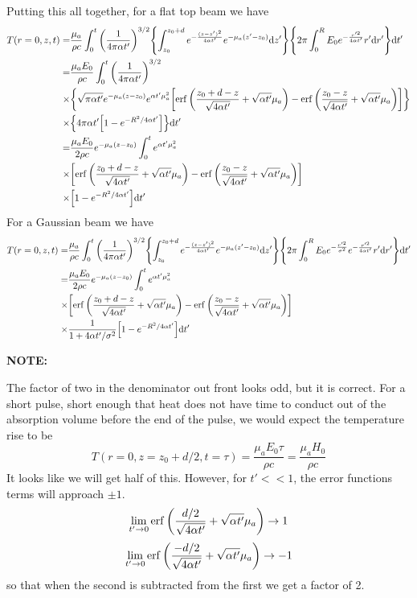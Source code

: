 \documentclass[]{article}
\begin{document}
Putting this all together, for a flat top beam we have
\begin{align}
  \label{eq:flattop_temp}
  T(r=0, z,t) =& \frac{\mu_a}{\rho c} \int_0^t \qty(\frac{1}{4\pi \alpha t'})^{3/2} \qty{\int_{z_0}^{z_0 + d}e^{-\frac{(z-z')^2}{4\alpha t'}} e^{-\mu_a (z'-z_0)} \dd z'} \qty{2\pi\int_{0}^{R} E_0 e^{-\frac{r'^2}{4\alpha t'}}r'\dd r'}\dd t' \nonumber \\
  =& \frac{\mu_a E_0}{\rho c} \int_0^t \qty(\frac{1}{4\pi \alpha t'})^{3/2}  \nonumber \\
  \times & \qty{\sqrt{\pi\alpha t'} e^{-\mu_a (z-z_0)} e^{\alpha t'\mu_a^2}\qty[\erf\qty(\frac{z_0 + d - z}{\sqrt{4\alpha t'}} + \sqrt{\alpha t'}\mu_a ) - \erf\qty(\frac{z_0 - z}{\sqrt{4\alpha t'}} + \sqrt{\alpha t'}\mu_a ) ]} \nonumber \\
  \times & \qty{4\pi \alpha t' \qty[1 - e^{-R^2/4\alpha t'}] } \dd t' \nonumber \\
  =& \frac{\mu_aE_0}{2\rho c}e^{-\mu_a (z-z_0)} \int_0^t e^{\alpha t'\mu_a^2}  \nonumber \\
  \times & \qty[\erf\qty(\frac{z_0 + d - z}{\sqrt{4\alpha t'}} + \sqrt{\alpha t'}\mu_a ) - \erf\qty(\frac{z_0 - z}{\sqrt{4\alpha t'}} + \sqrt{\alpha t'}\mu_a ) ] \nonumber \\
  \times & \qty[1 - e^{-R^2/4\alpha t'} ]
  \dd t'
\end{align}
For a Gaussian beam we have
\begin{align}
  \label{eq:gaussian_temp}
  T(r =0,z,t) =& \frac{\mu_a}{\rho c} \int_0^t \qty(\frac{1}{4\pi \alpha t'})^{3/2} \qty{\int_{z_0}^{z_0 + d}e^{-\frac{(z-z')^2}{4\alpha t'}} e^{-\mu_a (z'-z_0)} \dd z'} \qty{2\pi\int_{0}^{R} E_0 e^{-\frac{r'^2}{\sigma^2}} e^{-\frac{r'^2}{4\alpha t'}}r'\dd r'}\dd t' \nonumber \\
  =& \frac{\mu_aE_0}{2\rho c}e^{-\mu_a (z-z_0)} \int_0^t e^{\alpha t'\mu_a^2}  \nonumber \\
  \times & \qty[\erf\qty(\frac{z_0 + d - z}{\sqrt{4\alpha t'}} + \sqrt{\alpha t'}\mu_a ) - \erf\qty(\frac{z_0 - z}{\sqrt{4\alpha t'}} + \sqrt{\alpha t'}\mu_a ) ] \nonumber \\
  \times & \frac{1}{1 + 4\alpha t'/\sigma^2} \qty[1 - e^{-R^2/4\alpha t'} ]
  \dd t'
\end{align}

\textbf{NOTE:}

The factor of two in the denominator out front looks odd, but it is correct.
For a short pulse, short enough that heat does not have time to conduct out of the absorption volume
before the end of the pulse, we would expect the temperature rise to be
$$
T(r=0,z=z_0 + d/2,t=\tau) = \frac{\mu_a E_0 \tau}{\rho c} =  \frac{\mu_a H_0}{\rho c}
$$
It looks like we will get half of this. However, for $t' << 1$, the error functions terms will approach $\pm 1$.
$$
  \lim_{t'\rightarrow 0} \erf\qty(\frac{d/2}{\sqrt{4\alpha t'}} + \sqrt{\alpha t'}\mu_a ) \rightarrow 1
$$
$$
  \lim_{t'\rightarrow 0} \erf\qty(\frac{-d/2}{\sqrt{4\alpha t'}} + \sqrt{\alpha t'}\mu_a ) \rightarrow -1
$$
so that when the second is subtracted from the first we get a factor of 2.
\end{document}
